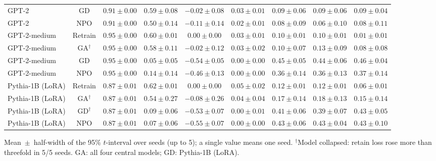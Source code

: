 {\begin{longtable}{@{\extracolsep{\fill}}lcccccccc@{}}
GPT-2 & GD & $0.91 \pm 0.00$ & $0.59 \pm 0.08$ & $-0.02 \pm 0.08$ & $0.03 \pm 0.01$ & $0.09 \pm 0.06$ & $0.09 \pm 0.06$ & $0.09 \pm 0.04$ \\
GPT-2 & NPO & $0.91 \pm 0.00$ & $0.50 \pm 0.14$ & $-0.11 \pm 0.14$ & $0.02 \pm 0.01$ & $0.08 \pm 0.09$ & $0.06 \pm 0.10$ & $0.08 \pm 0.11$ \\
GPT-2-medium & Retrain & $0.95 \pm 0.00$ & $0.60 \pm 0.01$ & $0.00 \pm 0.00$ & $0.03 \pm 0.01$ & $0.10 \pm 0.01$ & $0.10 \pm 0.01$ & $0.01 \pm 0.01$ \\
GPT-2-medium & GA$^{\dagger}$ & $0.95 \pm 0.00$ & $0.58 \pm 0.11$ & $-0.02 \pm 0.12$ & $0.03 \pm 0.02$ & $0.10 \pm 0.07$ & $0.13 \pm 0.09$ & $0.08 \pm 0.08$ \\
GPT-2-medium & GD & $0.95 \pm 0.00$ & $0.05 \pm 0.05$ & $-0.54 \pm 0.05$ & $0.00 \pm 0.00$ & $0.45 \pm 0.05$ & $0.44 \pm 0.06$ & $0.46 \pm 0.04$ \\
GPT-2-medium & NPO & $0.95 \pm 0.00$ & $0.14 \pm 0.14$ & $-0.46 \pm 0.13$ & $0.00 \pm 0.00$ & $0.36 \pm 0.14$ & $0.36 \pm 0.13$ & $0.37 \pm 0.14$ \\
Pythia-1B (LoRA) & Retrain & $0.87 \pm 0.01$ & $0.62 \pm 0.01$ & $0.00 \pm 0.00$ & $0.05 \pm 0.02$ & $0.12 \pm 0.01$ & $0.12 \pm 0.01$ & $0.06 \pm 0.01$ \\
Pythia-1B (LoRA) & GA$^{\dagger}$ & $0.87 \pm 0.01$ & $0.54 \pm 0.27$ & $-0.08 \pm 0.26$ & $0.04 \pm 0.04$ & $0.17 \pm 0.14$ & $0.18 \pm 0.13$ & $0.15 \pm 0.14$ \\
Pythia-1B (LoRA) & GD$^{\dagger}$ & $0.87 \pm 0.01$ & $0.09 \pm 0.06$ & $-0.53 \pm 0.07$ & $0.00 \pm 0.01$ & $0.41 \pm 0.06$ & $0.39 \pm 0.07$ & $0.43 \pm 0.05$ \\
Pythia-1B (LoRA) & NPO & $0.87 \pm 0.01$ & $0.07 \pm 0.06$ & $-0.55 \pm 0.07$ & $0.00 \pm 0.00$ & $0.43 \pm 0.06$ & $0.43 \pm 0.04$ & $0.43 \pm 0.10$ \\
\end{longtable}
Mean~$\pm$~half-width of the 95\% $t$-interval over seeds (up to 5); a single value means one seed. $^{\dagger}$Model collapsed: retain loss rose more than threefold in 5/5 seeds. GA: all four central models; GD: Pythia-1B (LoRA).\par
}
